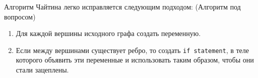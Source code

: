 Алгоритм Чайтина легко исправляется следующим подходом: (Алгоритм под вопросом)

\begin{enumerate} %
    \item Для каждой вершины исходного графа создать переменную.
    \item Если между вершинами существует ребро, то создать \texttt{if statement}, в теле
    которого объявить эти переменные и использовать таким образом, чтобы они стали зацеплены.
\end{enumerate}

